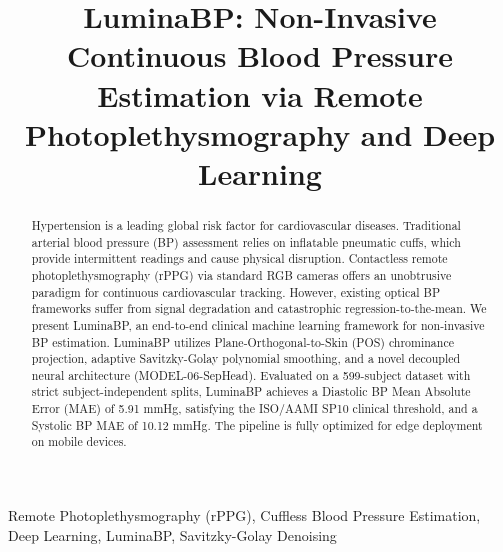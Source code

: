 \documentclass[journal]{IEEEtran}
\begin{document}
\title{LuminaBP: Non-Invasive Continuous Blood Pressure Estimation via Remote Photoplethysmography and Deep Learning}

\author{
}

\maketitle

\begin{abstract}
Hypertension is a leading global risk factor for cardiovascular diseases. Traditional arterial blood pressure (BP) assessment relies on inflatable pneumatic cuffs, which provide intermittent readings and cause physical disruption. Contactless remote photoplethysmography (rPPG) via standard RGB cameras offers an unobtrusive paradigm for continuous cardiovascular tracking. However, existing optical BP frameworks suffer from signal degradation and catastrophic regression-to-the-mean. We present LuminaBP, an end-to-end clinical machine learning framework for non-invasive BP estimation. LuminaBP utilizes Plane-Orthogonal-to-Skin (POS) chrominance projection, adaptive Savitzky-Golay polynomial smoothing, and a novel decoupled neural architecture (MODEL-06-SepHead). Evaluated on a 599-subject dataset with strict subject-independent splits, LuminaBP achieves a Diastolic BP Mean Absolute Error (MAE) of 5.91 mmHg, satisfying the ISO/AAMI SP10 clinical threshold, and a Systolic BP MAE of 10.12 mmHg. The pipeline is fully optimized for edge deployment on mobile devices.
\end{abstract}

\begin{IEEEkeywords}
Remote Photoplethysmography (rPPG), Cuffless Blood Pressure Estimation, Deep Learning, LuminaBP, Savitzky-Golay Denoising
\end{IEEEkeywords}









\end{document}
